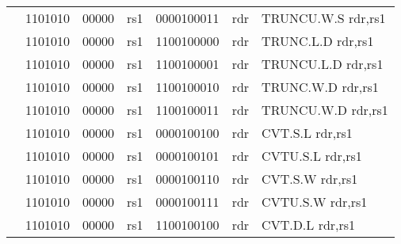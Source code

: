 \begin{table}[p]
\begin{small}
\begin{center}
\begin{tabular}{rcccccccccl}
&
\multicolumn{2}{|c|}{1101010} &
\multicolumn{1}{c|}{00000} &
\multicolumn{1}{c|}{rs1} &
\multicolumn{4}{c|}{0000100011} &
\multicolumn{1}{c|}{rdr} & TRUNCU.W.S rdr,rs1 \\
\cline{2-10}
  

&
\multicolumn{2}{|c|}{1101010} &
\multicolumn{1}{c|}{00000} &
\multicolumn{1}{c|}{rs1} &
\multicolumn{4}{c|}{1100100000} &
\multicolumn{1}{c|}{rdr} & TRUNC.L.D rdr,rs1 \\
\cline{2-10}
  

&
\multicolumn{2}{|c|}{1101010} &
\multicolumn{1}{c|}{00000} &
\multicolumn{1}{c|}{rs1} &
\multicolumn{4}{c|}{1100100001} &
\multicolumn{1}{c|}{rdr} & TRUNCU.L.D rdr,rs1 \\
\cline{2-10}
  

&
\multicolumn{2}{|c|}{1101010} &
\multicolumn{1}{c|}{00000} &
\multicolumn{1}{c|}{rs1} &
\multicolumn{4}{c|}{1100100010} &
\multicolumn{1}{c|}{rdr} & TRUNC.W.D rdr,rs1 \\
\cline{2-10}
  

&
\multicolumn{2}{|c|}{1101010} &
\multicolumn{1}{c|}{00000} &
\multicolumn{1}{c|}{rs1} &
\multicolumn{4}{c|}{1100100011} &
\multicolumn{1}{c|}{rdr} & TRUNCU.W.D rdr,rs1 \\
\cline{2-10}
  

&
\multicolumn{2}{|c|}{1101010} &
\multicolumn{1}{c|}{00000} &
\multicolumn{1}{c|}{rs1} &
\multicolumn{4}{c|}{0000100100} &
\multicolumn{1}{c|}{rdr} & CVT.S.L rdr,rs1 \\
\cline{2-10}
  

&
\multicolumn{2}{|c|}{1101010} &
\multicolumn{1}{c|}{00000} &
\multicolumn{1}{c|}{rs1} &
\multicolumn{4}{c|}{0000100101} &
\multicolumn{1}{c|}{rdr} & CVTU.S.L rdr,rs1 \\
\cline{2-10}
  

&
\multicolumn{2}{|c|}{1101010} &
\multicolumn{1}{c|}{00000} &
\multicolumn{1}{c|}{rs1} &
\multicolumn{4}{c|}{0000100110} &
\multicolumn{1}{c|}{rdr} & CVT.S.W rdr,rs1 \\
\cline{2-10}
  

&
\multicolumn{2}{|c|}{1101010} &
\multicolumn{1}{c|}{00000} &
\multicolumn{1}{c|}{rs1} &
\multicolumn{4}{c|}{0000100111} &
\multicolumn{1}{c|}{rdr} & CVTU.S.W rdr,rs1 \\
\cline{2-10}
  

&
\multicolumn{2}{|c|}{1101010} &
\multicolumn{1}{c|}{00000} &
\multicolumn{1}{c|}{rs1} &
\multicolumn{4}{c|}{1100100100} &
\multicolumn{1}{c|}{rdr} & CVT.D.L rdr,rs1 \\
\cline{2-10}
  


\end{tabular}
\end{center}
\end{small}
\end{table}
